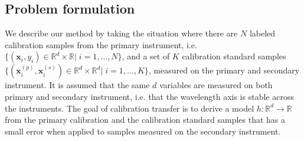 \documentclass{article}
\let\vec\mathbf
\begin{document}
\subsection{Problem formulation}
\label{sec: Problem formulation}
We describe our method by taking the situation where there are $N$ labeled calibration samples from the primary instrument, i.e. $\{(\vec x_i, y_i)\in\mathbb{R}^{d}\times\mathbb{R}|\;i=1,\dots,N\}$, and a set of $K$ calibration standard samples $\{(\vec x^{(p)}_i, \vec x^{(s)}_i)\in \mathbb{R}^{d}\times\mathbb{R}^{d}|\;i=1,\dots,K\}$,  measured on the primary and secondary instrument. It is assumed that 
the same $d$ variables are measured on both primary and secondary instrument, i.e. that the wavelength axis is stable across the instruments. The goal of calibration transfer is to derive a model $h:\mathbb{R}^d\rightarrow\mathbb{R}$ from the primary calibration and the calibration standard samples that has a small error when applied to samples measured on the secondary instrument.
\end{document}
